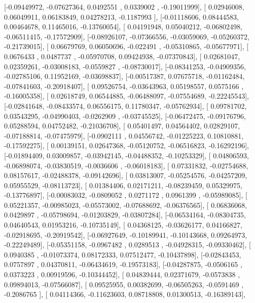 \documentclass{article}
\begin{document}
       [-0.09449972, -0.07627364,  0.0492551 ,  0.0339002 , -0.19011999],
       [ 0.02946008,  0.06049911,  0.06183849,  0.04278213, -0.1187993 ],
       [-0.01118606,  0.08444583,  0.00464678,  0.11465016, -0.13760054],
       [ 0.04191948,  0.05040212, -0.06802498, -0.06511415, -0.17572909],
       [-0.08926107, -0.07366556, -0.03059069, -0.05260372, -0.21739015],
       [ 0.06679769,  0.06050696, -0.022491  , -0.05310865, -0.05677971],
       [ 0.0676433 ,  0.0487737 , -0.05970708,  0.09424938, -0.07370843],
       [ 0.02681047,  0.02359261, -0.03008183, -0.0559827 , -0.08730017],
       [-0.08341253, -0.04909356, -0.02785106,  0.11952169, -0.03698837],
       [-0.00517387,  0.07675718, -0.01162484, -0.07841603, -0.20918407],
       [ 0.09526754, -0.03643963,  0.05198557,  0.0575166 , -0.16005358],
       [ 0.02618749,  0.06544885, -0.06488097, -0.07554689, -0.22245543],
       [-0.02841648, -0.08433574,  0.06556175,  0.11780347, -0.05762934],
       [ 0.09781702,  0.03543295, -0.04990403, -0.0262909 , -0.03745525],
       [-0.06472475, -0.09176796,  0.05288594,  0.04752482, -0.21036708],
       [ 0.05401497,  0.04564402,  0.02829107, -0.07188814, -0.07475979],
       [-0.0902111 ,  0.04556742, -0.01225223,  0.10810881, -0.17592275],
       [ 0.00139151,  0.02647368, -0.05120752, -0.06516823, -0.16292196],
       [-0.01894409,  0.03009857, -0.03942145, -0.04488352, -0.10253329],
       [ 0.04806593, -0.06898074, -0.03830519, -0.0036606 , -0.06018183],
       [ 0.07331832, -0.02754688,  0.08157617, -0.02488378, -0.09142696],
       [ 0.03813007, -0.05254576, -0.04257209,  0.05955529, -0.08113723],
       [ 0.01384406,  0.02171211, -0.08239459,  0.05329975, -0.13776897],
       [-0.00083032, -0.0809052 ,  0.0271172 ,  0.0961399 , -0.05989085],
       [ 0.05221357, -0.00985023, -0.05573002, -0.07688692, -0.06376565],
       [ 0.06836068,  0.0429897 , -0.05798694, -0.01203829, -0.03807284],
       [-0.06534164, -0.08304735,  0.04640543,  0.01953216, -0.10735149],
       [ 0.04368125, -0.03626177,  0.04166827, -0.02918695, -0.20919542],
       [-0.06927649, -0.10189941, -0.10143668,  0.09264973, -0.22249489],
       [-0.05351158, -0.0967482 ,  0.0289513 , -0.04928315, -0.09330462],
       [ 0.0940385 , -0.01073374,  0.08172333,  0.07512477, -0.10437898],
       [-0.02843453,  0.0757897 ,  0.04370811, -0.06434619, -0.19573183],
       [-0.04287875, -0.0506165 ,  0.0373223 ,  0.00919596, -0.10344452],
       [ 0.04839444,  0.02371679, -0.0573838 ,  0.09894013, -0.07566087],
       [ 0.09525955,  0.00382699, -0.06505263, -0.0591469 , -0.2086765 ],
       [ 0.04114366, -0.11623603,  0.08718808,  0.01300513, -0.16389143],
\end{document}
